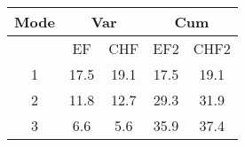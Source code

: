 \documentclass[10pt]{article}
\begin{document}
\begin{tabular}{*5c}
\toprule
Mode &  \multicolumn{2}{c}{Var} & \multicolumn{2}{c}{Cum}\\
\midrule
{}   & EF   & CHF    & EF2   & CHF2\\
1   &  17.5 & 19.1   & 17.5  & 19.1\\
2   &  11.8 & 12.7   & 29.3  & 31.9\\
3   &  6.6  &  5.6   & 35.9  & 37.4\\
\bottomrule
\end{tabular}
\end{document}
